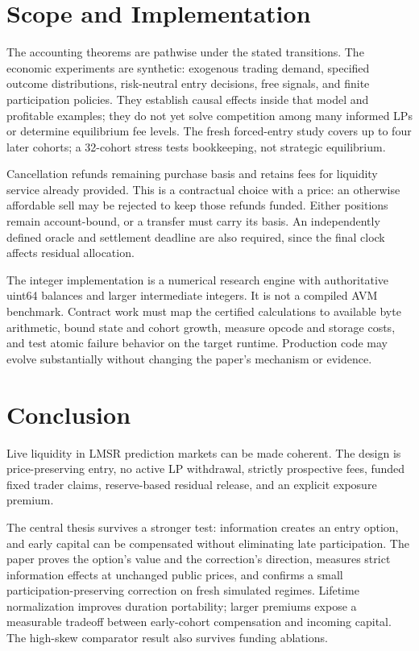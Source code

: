 \documentclass[10pt]{article}
\begin{document}
\section{Scope and Implementation}

The accounting theorems are pathwise under the stated transitions. The economic experiments are synthetic: exogenous trading demand, specified outcome distributions, risk-neutral entry decisions, free signals, and finite participation policies. They establish causal effects inside that model and profitable examples; they do not yet solve competition among many informed LPs or determine equilibrium fee levels. The fresh forced-entry study covers up to four later cohorts; a 32-cohort stress tests bookkeeping, not strategic equilibrium.

Cancellation refunds remaining purchase basis and retains fees for liquidity service already provided. This is a contractual choice with a price: an otherwise affordable sell may be rejected to keep those refunds funded. Either positions remain account-bound, or a transfer must carry its basis. An independently defined oracle and settlement deadline are also required, since the final clock affects residual allocation.

The integer implementation is a numerical research engine with authoritative uint64 balances and larger intermediate integers. It is not a compiled AVM benchmark. Contract work must map the certified calculations to available byte arithmetic, bound state and cohort growth, measure opcode and storage costs, and test atomic failure behavior on the target runtime. Production code may evolve substantially without changing the paper's mechanism or evidence.

\section{Conclusion}

Live liquidity in LMSR prediction markets can be made coherent. The design is price-preserving entry, no active LP withdrawal, strictly prospective fees, funded fixed trader claims, reserve-based residual release, and an explicit exposure premium.

The central thesis survives a stronger test: information creates an entry option, and early capital can be compensated without eliminating late participation. The paper proves the option's value and the correction's direction, measures strict information effects at unchanged public prices, and confirms a small participation-preserving correction on fresh simulated regimes. Lifetime normalization improves duration portability; larger premiums expose a measurable tradeoff between early-cohort compensation and incoming capital. The high-skew comparator result also survives funding ablations.
\end{document}
